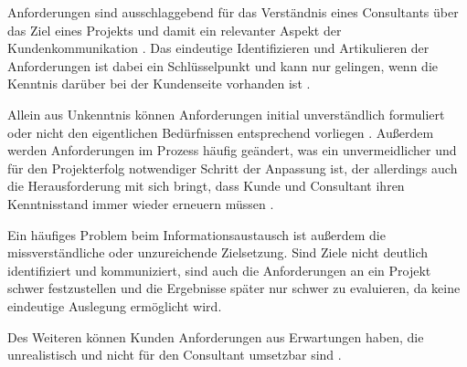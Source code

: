 \documentclass[../main.tex]{subfiles}
\begin{document}
Anforderungen sind ausschlaggebend für das Verständnis eines Consultants über das Ziel eines Projekts und damit ein relevanter Aspekt der Kundenkommunikation \autocite{davis2006communication}.
Das eindeutige Identifizieren und Artikulieren der Anforderungen ist dabei ein Schlüsselpunkt und kann nur gelingen, wenn die Kenntnis darüber bei der Kundenseite vorhanden ist \autocite{gamil2017identification, chakrabarti2004identification, salado2021systems}.

Allein aus Unkenntnis können Anforderungen initial unverständlich formuliert oder nicht den eigentlichen Bedürfnissen entsprechend vorliegen \autocite{bjarnason2017role}.
Außerdem werden Anforderungen im Prozess häufig geändert, was ein unvermeidlicher und für den Projekterfolg notwendiger Schritt der Anpassung ist, der allerdings auch die Herausforderung mit sich bringt, dass Kunde und Consultant ihren Kenntnisstand immer wieder erneuern müssen \autocite{oleff2022proaktives, davis2006communication, gamil2017identification}.

Ein häufiges Problem beim Informationsaustausch ist außerdem die missverständliche oder unzureichende Zielsetzung.
Sind Ziele nicht deutlich identifiziert und kommuniziert, sind auch die Anforderungen an ein Projekt schwer festzustellen und die Ergebnisse später nur schwer zu evaluieren, da keine eindeutige Auslegung ermöglicht wird.
\autocite{cothran2005developing,appelbaum2005critical}

Des Weiteren können Kunden Anforderungen aus Erwartungen haben, die unrealistisch und nicht für den Consultant umsetzbar sind \autocite{bjarnason2017role}.
\end{document}
